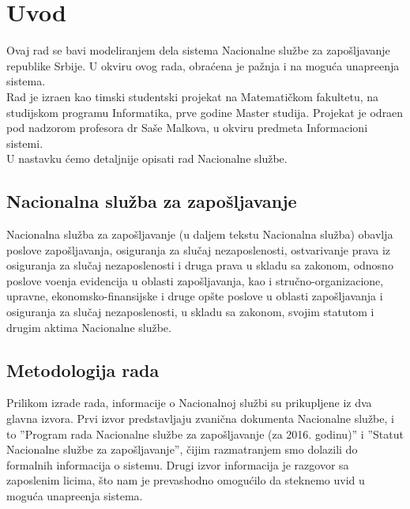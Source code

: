\section{Uvod}

Ovaj rad se bavi modeliranjem dela sistema Nacionalne slu\v zbe za zapo\v sljavanje republike Srbije. U okviru ovog rada, obra\' cena je pa\v znja i na mogu\' ca unapre\dj enja sistema.\\

Rad je izra\dj en kao timski studentski projekat na Matemati\v ckom fakultetu, na studijskom programu Informatika, prve godine Master studija. Projekat je odra\dj en pod nadzorom profesora dr Sa\v se Malkova, u okviru predmeta Informacioni sistemi.\\

U nastavku \' cemo detaljnije opisati rad Nacionalne slu\v zbe.

\subsection{Nacionalna slu\v zba za zapo\v sljavanje}

Nacionalna slu\v zba za zapo\v sljavanje (u daljem tekstu Nacionalna slu\v zba) obavlja poslove zapo\v sljavanja, osiguranja za slu\v caj nezaposlenosti, ostvarivanje prava iz osiguranja za slu\v caj nezaposlenosti i druga prava u skladu sa zakonom, odnosno poslove vo\dj enja evidencija u oblasti zapo\v sljavanja, kao i stru\v cno-organi\-zacione, upravne, ekonomsko-finansijske i druge op\v ste poslove u oblasti zapo\v sljavanja i osiguranja za slu\v caj nezaposlenosti, u skladu sa zakonom, svojim statutom i drugim aktima Nacionalne slu\v zbe.

\subsection{Metodologija rada}

Prilikom izrade rada, informacije o Nacionalnoj slu\v zbi su prikupljene iz dva glavna izvora. Prvi izvor predstavljaju zvani\v cna dokumenta Nacionalne slu\v zbe, i to ''Program rada Nacionalne slu\v zbe za zapo\v sljavanje (za 2016. godinu)'' i ''Statut Nacionalne slu\v zbe za zapo\v sljavanje'', \v cijim razmatranjem smo dolazili do formalnih informacija o sistemu. Drugi izvor informacija je razgovor sa zaposlenim licima, \v sto nam je prevashodno omogu\' cilo da steknemo uvid u mogu\' ca unapre\dj enja sistema.\\

